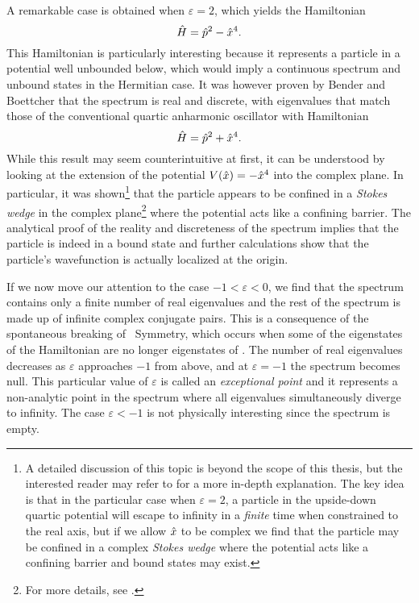             A remarkable case is obtained when $\varepsilon = 2$, which yields the Hamiltonian
            \begin{equation}
                \hat{H} = \hat{p}^2 - \hat{x}^4
                \text{.}
            \end{equation}
            This Hamiltonian is particularly interesting because it represents a particle in a potential well unbounded below, which would imply a continuous spectrum and unbound states in the Hermitian case. It was however proven by Bender and Boettcher \cite{Bender1998} that the spectrum is real and discrete, with eigenvalues that match those of the conventional quartic anharmonic oscillator with Hamiltonian
            \begin{equation}
                \hat{H} = \hat{p}^2 + \hat{x}^4
                \text{.}
            \end{equation}
            While this result may seem counterintuitive at first, it can be understood by looking at the extension of the potential $V\pqty{\hx} = -\hx^4$ into the complex plane. In particular, it was shown\footnote{A detailed discussion of this topic is beyond the scope of this thesis, but the interested reader may refer to \cite{Bender1998,bender2024} for a more in-depth explanation. The key idea is that in the particular case when $\varepsilon = 2$, a particle in the upside-down quartic potential will escape to infinity in a \emph{finite} time when constrained to the real axis, but if we allow $\hat{x}$ to be complex we find that the particle may be confined in a complex \emph{Stokes wedge} where the potential acts like a confining barrier and bound states may exist.} that the particle appears to be confined in a \emph{Stokes wedge} in the complex plane\footnote{For more details, see .} where the potential acts like a confining barrier. The analytical proof of the reality and discreteness of the spectrum implies that the particle is indeed in a bound state and further calculations show that the particle's wavefunction is actually localized at the origin.

            If we now move our attention to the case $-1 < \varepsilon < 0$, we find that the spectrum contains only a finite number of real eigenvalues and the rest of the spectrum is made up of infinite complex conjugate pairs. This is a consequence of the spontaneous breaking of \PT\ Symmetry, which occurs when some of the eigenstates of the Hamiltonian are no longer eigenstates of \hPT. The number of real eigenvalues decreases as $\varepsilon$ approaches $-1$ from above, and at $\varepsilon = -1$ the spectrum becomes null. This particular value of $\varepsilon$ is called an \emph{exceptional point} and it represents a non-analytic point in the spectrum where all eigenvalues simultaneously diverge to infinity. The case $\varepsilon < -1$ is not physically interesting since the spectrum is empty.